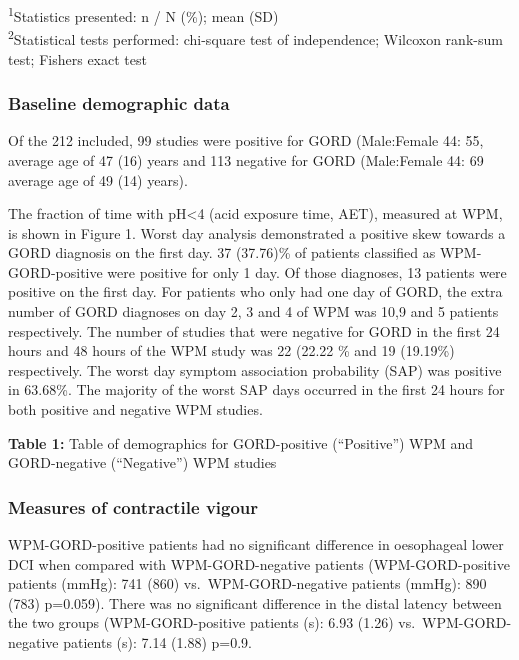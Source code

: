 \documentclass[english,man,floatsintext]{apa6}
\begin{document}
\vspace{-5mm}
\begin{minipage}{\linewidth}
\textsuperscript{1}Statistics presented: n / N (\%); mean (SD) \\ 
\textsuperscript{2}Statistical tests performed: chi-square test of independence; Wilcoxon rank-sum test; Fisher\textquotesingle{}s exact test \\ 
\end{minipage}

\hypertarget{baseline-demographic-data}{%
\subsubsection{Baseline demographic data}\label{baseline-demographic-data}}

Of the 212 included, 99 studies were positive for GORD (Male:Female 44: 55, average age of 47 (16) years and
113 negative for GORD (Male:Female 44: 69 average age of 49 (14) years).

The fraction of time with pH\textless{}4 (acid exposure time, AET), measured at WPM, is shown in Figure 1. Worst day analysis demonstrated a positive skew towards a GORD diagnosis on the first day. 37 (37.76)\% of patients classified as WPM-GORD-positive were positive for only 1 day. Of those diagnoses, 13 patients were positive on the first day. For patients who only had one day of GORD, the extra number of GORD diagnoses on day 2, 3 and 4 of WPM was 10,9 and 5 patients respectively. The number of studies that were negative for GORD in the first 24 hours and 48 hours of the WPM study was 22 (22.22 \% and 19 (19.19\%) respectively. The worst day symptom association probability (SAP) was positive in 63.68\%. The majority of the worst SAP days occurred in the first 24 hours for both positive and negative WPM studies.

\textbf{Table 1:} Table of demographics for GORD-positive (\enquote{Positive}) WPM and GORD-negative (\enquote{Negative}) WPM studies

\hypertarget{measures-of-contractile-vigour}{%
\subsubsection{Measures of contractile vigour}\label{measures-of-contractile-vigour}}

WPM-GORD-positive patients had no significant difference in oesophageal lower DCI when compared with WPM-GORD-negative patients (WPM-GORD-positive patients (mmHg): 741 (860) vs.~WPM-GORD-negative patients (mmHg): 890 (783) p=0.059). There was no significant difference in the distal latency between the two groups (WPM-GORD-positive patients (s): 6.93 (1.26) vs.~WPM-GORD-negative patients (s): 7.14 (1.88) p=0.9.
\end{document}
